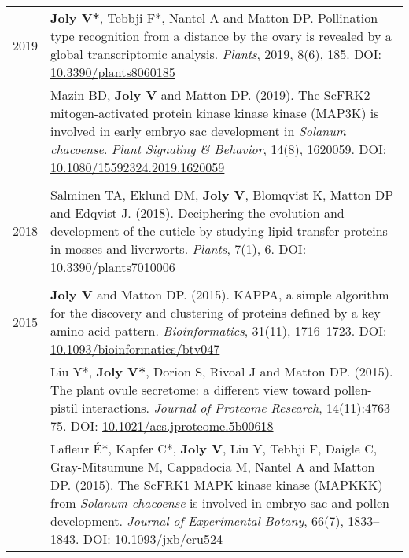 \documentclass[letterpaper,12pt]{article}
\begin{document}
\begin{tabularx}{\textwidth}{@{}r|X@{}}

2019
& \textbf{Joly V*}, Tebbji F*, Nantel A and Matton DP.
  Pollination type recognition from a distance by the ovary is revealed by a
  global transcriptomic analysis.
  \emph{Plants}, 2019, 8(6), 185.
  DOI: \href{http://doi.org/10.3390/plants8060185}{10.3390/plants8060185}
  \\

& Mazin BD, \textbf{Joly V} and Matton DP. (2019).
  The ScFRK2 mitogen-activated protein kinase kinase kinase (MAP3K) is involved
  in early embryo sac development in \emph{Solanum chacoense}.
  \emph{Plant Signaling \& Behavior}, 14(8), 1620059.
  DOI: \href{http://doi.org/10.1080/15592324.2019.1620059}
  {10.1080/15592324.2019.1620059}
  \\

\multicolumn{2}{c}{} \\

2018
& Salminen TA, Eklund DM, \textbf{Joly V}, Blomqvist K, Matton DP
  and Edqvist J. (2018).
  Deciphering the evolution and development of the cuticle by studying lipid
  transfer proteins in mosses and liverworts.
  \emph{Plants}, 7(1), 6.
  DOI: \href{http://doi.org/10.3390/plants7010006}{10.3390/plants7010006}
  \\

\multicolumn{2}{c}{} \\

2015
& \textbf{Joly V} and Matton DP. (2015).
  KAPPA, a simple algorithm for the discovery and clustering of proteins defined
  by a key amino acid pattern.
  \emph{Bioinformatics}, 31(11), 1716--1723.
  DOI: \href{http://doi.org/10.1093/bioinformatics/btv047}
  {10.1093/bioinformatics/btv047}
  \vspace{3mm}
  \\

& Liu Y*, \textbf{Joly V*}, Dorion S, Rivoal J and Matton DP. (2015).
  The plant ovule secretome: a different view toward pollen-pistil interactions.
  \emph{Journal of Proteome Research}, 14(11):4763--75.
  DOI: \href{http://doi.org/10.1021/acs.jproteome.5b00618}
  {10.1021/acs.jproteome.5b00618}
  \vspace{3mm}
  \\

& Lafleur É*, Kapfer C*, \textbf{Joly V}, Liu Y, Tebbji F, Daigle C,
  Gray-Mitsumune M, Cappadocia M, Nantel A and Matton DP. (2015).
  The ScFRK1 MAPK kinase kinase (MAPKKK) from \emph{Solanum chacoense} is
  involved in embryo sac and pollen development.
  \emph{Journal of Experimental Botany}, 66(7), 1833--1843.
  DOI: \href{http://doi.org/10.1093/jxb/eru524}{10.1093/jxb/eru524}
  \\


\end{tabularx}
\end{document}
